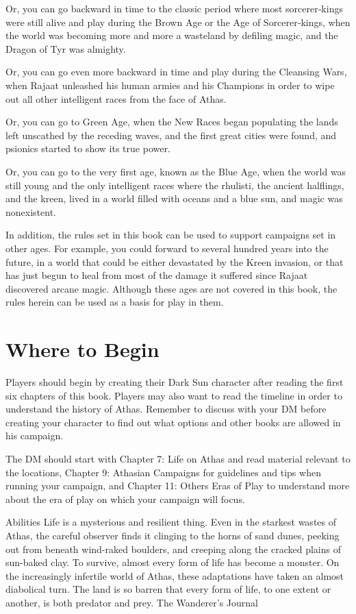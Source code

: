 \documentclass[10pt,a4paper,twocolumn]{d20}
\begin{document}
Or, you can go backward in time to the classic period where most sorcerer‐kings were still alive and play during the Brown Age or the Age of Sorcerer‐kings, when the world was becoming more and more a wasteland by defiling magic, and the Dragon of Tyr was almighty.

Or, you can go even more backward in time and play during the Cleansing Wars, when Rajaat unleashed his human armies and his Champions in order to wipe out all other intelligent races from the face of Athas.

Or, you can go to Green Age, when the New Races began populating the lands left unscathed by the receding waves, and the first great cities were found, and psionics started to show its true power.

Or, you can go to the very first age, known as the Blue Age, when the world was still young and the only intelligent races where the rhulisti, the ancient halflings, and the kreen, lived in a world filled with oceans and a blue sun, and magic was nonexistent.

In addition, the rules set in this book can be used to support campaigns set in other ages. For example, you could forward to several hundred years into the future, in a world that could be either devastated by the Kreen invasion, or that has just begun to heal from most of the damage it suffered since Rajaat discovered arcane magic. Although these ages are not covered in this book, the rules herein can be used as a basis for play in them.

\section{Where to Begin}

Players should begin by creating their Dark Sun character after reading the first six chapters of this book. Players may also want to read the timeline in order to understand the history of Athas. Remember to discuss with your DM before creating your character to find out what options and other books are allowed in his campaign.

The DM should start with Chapter 7: Life on Athas and read material relevant to the locations, Chapter 9: Athasian Campaigns for guidelines and tips when running your campaign, and Chapter 11: Others Eras of Play to understand more about the era of play on which your campaign will focus.

\Chapter
{Abilities}
{Life is a mysterious and resilient thing. Even in the starkest wastes of Athas, the careful observer finds it clinging to the horns of sand dunes, peeking out from beneath wind-raked boulders, and creeping along the cracked plains of sun-baked clay.
To survive, almost every form of life has become a monster. On the increasingly infertile world of Athas, these adaptations have taken an almost diabolical turn. The land is so barren that every form of life, to one extent or another, is both predator and prey.}
{The Wanderer’s Journal}
\end{document}
